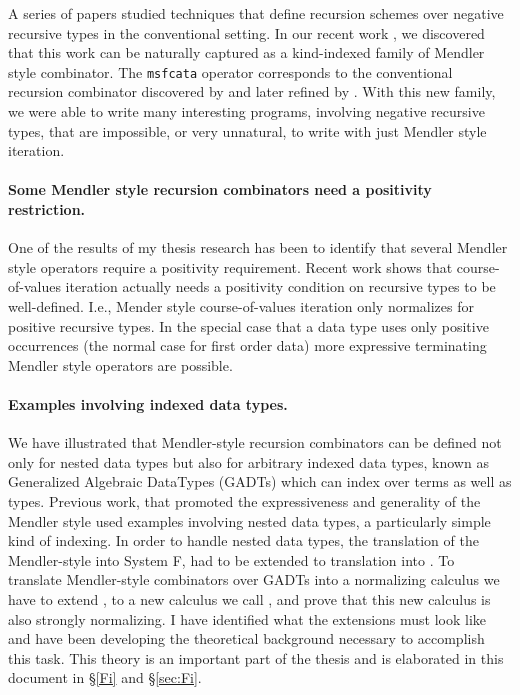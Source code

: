 A series of papers
\cite{Pat93,MeiHut95,FegShe96,DesPfeSch97,bgb} studied 
techniques that define recursion schemes
over negative recursive types in the conventional setting. In our recent work
\cite{AhnShe11}, we discovered that this work can be naturally captured
as a kind-indexed family of Mendler style combinator. The \verb+msfcata+
operator corresponds to the conventional recursion combinator discovered by
\citet{FegShe96} and later refined by \citet{bgb}. With this new family, we were
able to write many interesting programs, involving negative recursive types,
that are impossible, or very unnatural, to write with just Mendler style iteration.


\paragraph{Some Mendler style recursion combinators need a positivity restriction.}
One of the results of my thesis research has been to identify that several Mendler
style operators require a positivity requirement. 
Recent work \cite{AhnShe11} shows 
that course-of-values iteration \cite{vene00phd,UusVen02} actually
needs a positivity condition on recursive types to be well-defined. I.e., Mender style 
course-of-values iteration only normalizes for positive recursive types.
In the special case that a data type uses only positive occurrences (the normal case
for first order data) more expressive terminating Mendler style operators are possible.


\paragraph{Examples involving indexed data types.} 
We \cite{AhnShe11} have illustrated that Mendler-style recursion combinators can
be defined not only for nested data types but also for arbitrary indexed data types,
known as Generalized Algebraic DataTypes (GADTs) which can index over terms as well as types.
Previous work, that promoted the expressiveness and generality of the Mendler style
\cite{AbeMatUus03,AbeMatUus05,AbeMat04} used examples involving nested data types,
a particularly simple kind of indexing. In order to handle nested data types, the
translation of the Mendler-style into System F, had to be extended to translation
into \Fw. To translate Mendler-style combinators over GADTs
into a normalizing calculus we have to extend \Fw, 
to a new calculus we call \Fi, and prove that this new
calculus is also strongly normalizing. I have identified what the extensions must
look like and have been developing the theoretical background necessary to
accomplish this task. This theory is an important part of the thesis
and is elaborated in this document in \S\ref{Fi} and \S\ref{sec:Fi}.

